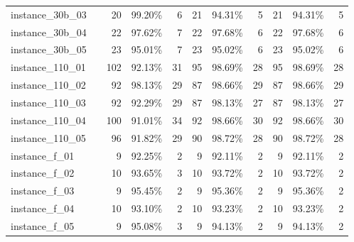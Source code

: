 \documentclass[12pt,a4paper,openright,twoside]{book}
\begin{document}
\begin{table}[H]
{\begin{tabular}{|ll|rrr|rrr|rrr|}
instance\_30b\_03              &     &     20  &    99.20\%  &   6   &   21  &   94.31\%  &   5   &   21  &     94.31\%  &   5  \\   
instance\_30b\_04              &     &     22  &    97.62\%  &   7   &   22  &   97.68\%  &   6   &   22  &     97.68\%  &   6  \\   
instance\_30b\_05              &     &     23  &    95.01\%  &   7   &   23  &   95.02\%  &   6   &   23  &     95.02\%  &   6  \\   
instance\_110\_01             &     &     102  &  92.13\%  &   31   &   95  &  98.69\%  &   28   &   95  &   98.69\%  &   28  \\         
instance\_110\_02             &     &     92  &  98.13\%  &   29    &   87  &  98.66\%  &   29   &   87  &   98.66\%  &   29  \\        
instance\_110\_03             &     &     92  &  92.29\%  &   29    &   87  &  98.13\%  &   27   &   87  &   98.13\%  &   27  \\     
instance\_110\_04             &     &     100  &  91.01\%  &   34   &   92  &  98.66\%  &   30   &   92  &   98.66\%  &   30  \\      
instance\_110\_05             &     &     96  &  91.82\%  &   29    &   90  &  98.72\%  &   28   &   90  &   98.72\%  &   28  \\
instance\_f\_01               &     &     9  &    92.25\%  &   2    &   9  &     92.11\%  &   2  &   9  &     92.11\%  &   2  \\  
instance\_f\_02               &     &     10  &    93.65\%  &   3   &   10  &  93.72\%  &   2   &   10  &     93.72\%  &   2  \\   
instance\_f\_03               &     &     9  &    95.45\%  &   2    &   9  &    95.36\%  &   2   &   9  &     95.36\%  &   2  \\  
instance\_f\_04               &     &     10  &    93.10\%  &   2   &   10  &   93.23\%  &   2   &   10  &     93.23\%  &   2  \\   
instance\_f\_05               &     &     9  &    95.08\%  &   3    &   9  &    94.13\%  &   2   &   9  &     94.13\%  &   2  \\
 \hline
\end{tabular}
}
\end{table}
\end{document}
